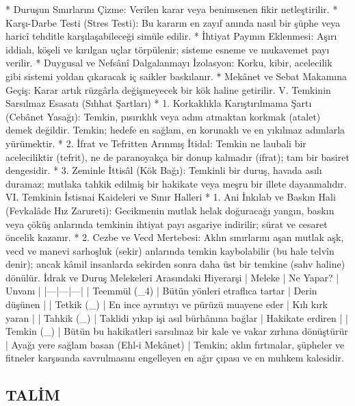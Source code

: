 \documentclass[11pt,a4paper]{article}
\begin{document}
 * Duruşun Sınırlarını Çizme: Verilen karar veya benimsenen fikir netleştirilir.
 * Karşı-Darbe Testi (Stres Testi): Bu kararın en zayıf anında nasıl bir şüphe veya haricî tehditle karşılaşabileceği simüle edilir.
 * İhtiyat Payının Eklenmesi: Aşırı iddialı, köşeli ve kırılgan uçlar törpülenir; sisteme esneme ve mukavemet payı verilir.
 * Duygusal ve Nefsânî Dalgalanmayı İzolasyon: Korku, kibir, acelecilik gibi sistemi yoldan çıkaracak iç saikler baskılanır.
 * Mekânet ve Sebat Makamına Geçiş: Karar artık rüzgârla değişmeyecek bir kök haline getirilir.
V. Temkinin Sarsılmaz Esasatı (Sıhhat Şartları)
 * 1. Korkaklıkla Karıştırılmama Şartı (Cebânet Yasağı):
   Temkin, pısırıklık veya adım atmaktan korkmak (atalet) demek değildir. Temkin; hedefe en sağlam, en korunaklı ve en yıkılmaz adımlarla yürümektir.
 * 2. İfrat ve Tefritten Arınmış İtidal:
   Temkin ne laubali bir aceleciliktir (tefrit), ne de paranoyakça bir donup kalmadır (ifrat); tam bir basiret dengesidir.
 * 3. Zeminle İttisâl (Kök Bağı):
   Temkinli bir duruş, havada asılı duramaz; mutlaka tahkik edilmiş bir hakikate veya meşru bir illete dayanmalıdır.
VI. Temkinin İstisnai Kaideleri ve Sınır Halleri
 * 1. Ani İnkılab ve Baskın Hali (Fevkalâde Hız Zarureti):
   Gecikmenin mutlak helak doğuracağı yangın, baskın veya çöküş anlarında temkinin ihtiyat payı asgariye indirilir; sürat ve cesaret öncelik kazanır.
 * 2. Cezbe ve Vecd Mertebesi:
   Aklın sınırlarını aşan mutlak aşk, vecd ve manevi sarhoşluk (sekir) anlarında temkin kaybolabilir (bu hale telvîn denir); ancak kâmil insanlarda sekirden sonra daha üst bir temkine (sahv haline) dönülür.
İdrak ve Duruş Melekeleri Arasındaki Hiyerarşi
| Meleke | Ne Yapar? | Unvanı |
|---|---|---|
| Teemmül (_4) | Bütün yönleri etraflıca tartar | Derin düşünen |
| Tetkik (_{}) | En ince ayrıntıyı ve pürüzü muayene eder | Kılı kırk yaran |
| Tahkik (_{}) | Taklidi yıkıp işi asıl bürhânına bağlar | Hakikate erdiren |
| Temkin (_{}) | Bütün bu hakikatleri sarsılmaz bir kale ve vakar zırhına dönüştürür | Ayağı yere sağlam basan (Ehl-i Mekânet) |
Temkin; aklın fırtınalar, şüpheler ve fitneler karşısında savrulmasını engelleyen en ağır çıpası ve en muhkem kalesidir.




\subsection{TALİM}
\end{document}
